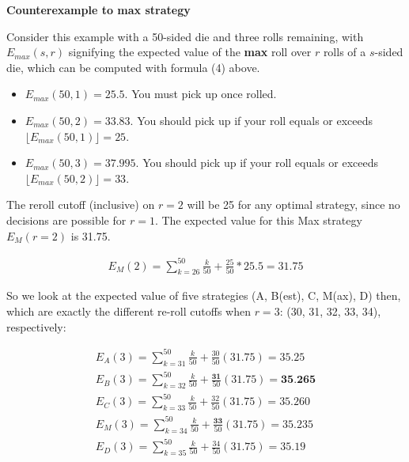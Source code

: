 \documentclass[11pt, oneside]{article} 	%
\begin{document}
\textbf{Counterexample to max strategy}

Consider this example with a 50-sided die and three rolls remaining, with $E_{max}(s, r)$ signifying the expected value of the \textbf{max} roll over $r$ rolls of a $s$-sided die, which can be computed with formula (4) above.

\begin{itemize}
\item $E_{max}(50, 1) = 25.5$. You must pick up once rolled.
\item $E_{max}(50,2) = 33.83$. You should pick up if your roll equals or exceeds $\lfloor E_{max}(50, 1)\rfloor = 25$.
\item $E_{max}(50,3) = 37.995$. You should pick up if your roll equals or exceeds $\lfloor E_{max}(50,2) \rfloor = 33$.
\end{itemize}
 

The reroll cutoff (inclusive) on $r=2$ will be 25 for any optimal strategy, since no decisions are possible for $r=1$.  The expected value for this Max strategy $E_M(r  = 2)$ is 31.75.

\begin{align}
E_M(2)  = \sum_{k=26}^{50} \frac{k}{50} + \frac{25}{50}*25.5 = 31.75 
\end{align}

So we look at the expected value of five strategies (A, B(est), C, M(ax), D) then, which are exactly the different re-roll cutoffs when $r=3$: (30, 31, 32, 33, 34), respectively:

\begin{align}
E_A(3) = \sum_{k=31}^{50} \frac{k}{50} + \frac{30}{50} (31.75) = 35.25 \\
E_B(3) = \sum_{k=32}^{50} \frac{k}{50} + \frac{\textbf{31}}{50} (31.75) = \textbf{35.265} \\
E_C(3) =  \sum_{k=33}^{50} \frac{k}{50} + \frac{32}{50} (31.75) = 35.260 \\
E_M(3) = \sum_{k=34}^{50} \frac{k}{50} + \frac{\textbf{33}}{50}(31.75) = 35.235 \\
E_D(3) = \sum_{k=35}^{50} \frac{k}{50} + \frac{34}{50} (31.75) = 35.19
\end{align}
\end{document}
